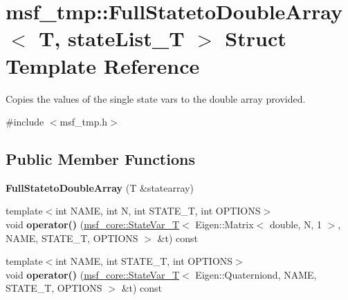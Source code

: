 \hypertarget{structmsf__tmp_1_1FullStatetoDoubleArray}{\section{msf\-\_\-tmp\-:\-:Full\-Stateto\-Double\-Array$<$ T, state\-List\-\_\-\-T $>$ Struct Template Reference}
\label{structmsf__tmp_1_1FullStatetoDoubleArray}
}


Copies the values of the single state vars to the double array provided.  




{\ttfamily \#include $<$msf\-\_\-tmp.\-h$>$}

\subsection*{Public Member Functions}
\begin{DoxyCompactItemize}
\item 
\hypertarget{structmsf__tmp_1_1FullStatetoDoubleArray_a50347ec2470ab4fdd050d9f0c49c7619}{{\bfseries Full\-Stateto\-Double\-Array} (T \&statearray)}\label{structmsf__tmp_1_1FullStatetoDoubleArray_a50347ec2470ab4fdd050d9f0c49c7619}

\item 
\hypertarget{structmsf__tmp_1_1FullStatetoDoubleArray_ab71ebd14ea9ec91f3058fcd235f0f900}{{\footnotesize template$<$int N\-A\-M\-E, int N, int S\-T\-A\-T\-E\-\_\-\-T, int O\-P\-T\-I\-O\-N\-S$>$ }\\void {\bfseries operator()} (\hyperlink{structmsf__core_1_1StateVar__T}{msf\-\_\-core\-::\-State\-Var\-\_\-\-T}$<$ Eigen\-::\-Matrix$<$ double, N, 1 $>$, N\-A\-M\-E, S\-T\-A\-T\-E\-\_\-\-T, O\-P\-T\-I\-O\-N\-S $>$ \&t) const }\label{structmsf__tmp_1_1FullStatetoDoubleArray_ab71ebd14ea9ec91f3058fcd235f0f900}

\item 
\hypertarget{structmsf__tmp_1_1FullStatetoDoubleArray_afca6650482318e48f51ca2dfc1cb94be}{{\footnotesize template$<$int N\-A\-M\-E, int S\-T\-A\-T\-E\-\_\-\-T, int O\-P\-T\-I\-O\-N\-S$>$ }\\void {\bfseries operator()} (\hyperlink{structmsf__core_1_1StateVar__T}{msf\-\_\-core\-::\-State\-Var\-\_\-\-T}$<$ Eigen\-::\-Quaterniond, N\-A\-M\-E, S\-T\-A\-T\-E\-\_\-\-T, O\-P\-T\-I\-O\-N\-S $>$ \&t) const }\label{structmsf__tmp_1_1FullStatetoDoubleArray_afca6650482318e48f51ca2dfc1cb94be}

\end{DoxyCompactItemize}


